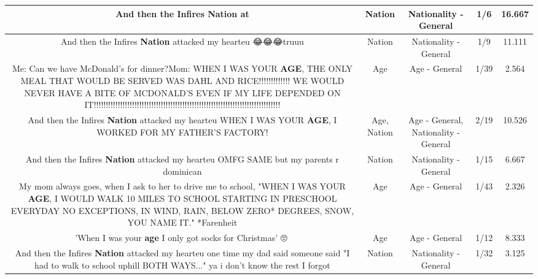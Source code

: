 \documentclass[11pt]{article}
\newlength\mylength
\begin{document}
\begin{center}
\begin{longtable}{|C{.65\mylength}|C{.30\mylength}|C{.12\mylength}|C{.12\mylength}|C{.12\mylength}|}
  \small And then the Infires \textbf{Nation} at\normalsize   & Nation & Nationality - General & 1/6 & 16.667 \\  \hline
  \small And then the Infires \textbf{Nation} attacked my hearteu 😂😂😂truuu\normalsize   & Nation & Nationality - General & 1/9 & 11.111 \\  \hline
  \small Me: Can we have McDonald's for dinner?Mom: WHEN I WAS YOUR \textbf{AGE}, THE ONLY MEAL THAT WOULD BE SERVED WAS DAHL AND RICE!!!!!!!!!!!!!  WE WOULD NEVER HAVE A BITE OF MCDONALD'S EVEN IF MY LIFE DEPENDED ON IT!!!!!!!!!!!!!!!!!!!!!!!!!!!!!!!!!!!!!!!!!!!!!!!!!!!!!!!!!!!!!!!!!!!!!!!!!!!!!!\normalsize   & Age & Age - General & 1/39 & 2.564 \\  \hline
  \small And then the Infires \textbf{Nation} attacked my hearteu WHEN I WAS YOUR \textbf{AGE}, I WORKED FOR MY FATHER'S FACTORY!\normalsize   & Age, Nation & Age - General, Nationality - General & 2/19 & 10.526 \\  \hline
  \small And then the Infires \textbf{Nation} attacked my hearteu OMFG SAME but my parents r dominican\normalsize   & Nation & Nationality - General & 1/15 & 6.667 \\  \hline
  \small My mom always goes, when I ask to her to drive me to school, "WHEN I WAS YOUR \textbf{AGE}, I WOULD WALK 10 MILES TO SCHOOL STARTING IN PRESCHOOL EVERYDAY NO EXCEPTIONS, IN WIND, RAIN, BELOW ZERO* DEGREES, SNOW, YOU NAME IT." *Farenheit\normalsize   & Age & Age - General & 1/43 & 2.326 \\  \hline
  \small 'When I was your \textbf{age} I only got socks for Christmas' 🙄🤪\normalsize   & Age & Age - General & 1/12 & 8.333 \\  \hline
  \small And then the Infires \textbf{Nation} attacked my hearteu one time my dad said someone said "I had to walk to school uphill BOTH WAYS..." ya i don't know the rest I forgot\normalsize   & Nation & Nationality - General & 1/32 & 3.125 \\  \hline

\end{longtable}
\end{center}
\end{document}
